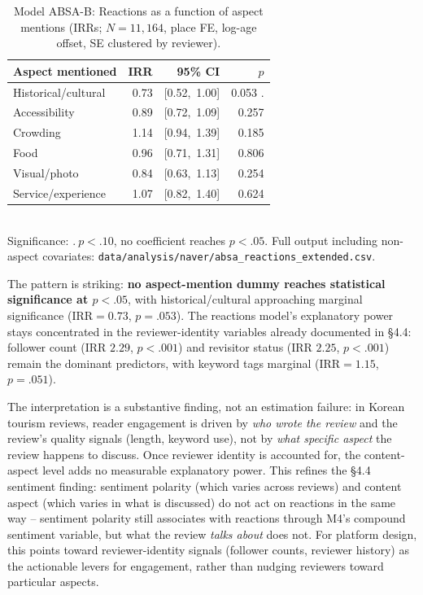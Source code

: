 \documentclass[10pt,a4paper]{article}
\begin{document}
\begin{table}[H]\centering
\caption{Model ABSA-B: Reactions as a function of aspect mentions (IRRs; $N=11{,}164$, place FE, log-age offset, SE clustered by reviewer).}
\label{tab:absaB}
\footnotesize
\begin{tabular}{@{}lrrr@{}}
\toprule
Aspect mentioned             & IRR   & 95\% CI               & $p$      \\
\midrule
Historical/cultural          & 0.73  & [0.52,\, 1.00]        & 0.053 .   \\
Accessibility                & 0.89  & [0.72,\, 1.09]        & 0.257    \\
Crowding                     & 1.14  & [0.94,\, 1.39]        & 0.185    \\
Food                         & 0.96  & [0.71,\, 1.31]        & 0.806    \\
Visual/photo                 & 0.84  & [0.63,\, 1.13]        & 0.254    \\
Service/experience           & 1.07  & [0.82,\, 1.40]        & 0.624    \\
\bottomrule
\end{tabular}
\\[3pt]
{\scriptsize Significance: $.\ p<.10$, no coefficient reaches $p<.05$. Full output including non-aspect covariates: \texttt{data/analysis/naver/absa\_reactions\_extended.csv}.}
\end{table}

The pattern is striking: \textbf{no aspect-mention dummy reaches
statistical significance at $p<.05$}, with historical/cultural
approaching marginal significance ($\text{IRR}=0.73$, $p=.053$). The
reactions model's explanatory power stays concentrated in the
reviewer-identity variables already documented in \S4.4: follower count
(IRR $2.29$, $p<.001$) and revisitor status (IRR $2.25$, $p<.001$)
remain the dominant predictors, with keyword tags marginal
($\text{IRR}=1.15$, $p=.051$).

The interpretation is a substantive finding, not an estimation failure:
in Korean tourism reviews, reader engagement is driven by \emph{who
wrote the review} and the review's quality signals (length, keyword use),
not by \emph{what specific aspect} the review happens to discuss. Once
reviewer identity is accounted for, the content-aspect level adds no
measurable explanatory power. This refines the \S4.4 sentiment finding:
sentiment polarity (which varies across reviews) and content aspect
(which varies in what is discussed) do not act on reactions in the same
way -- sentiment polarity still associates with reactions through M4's
compound sentiment variable, but what the review \emph{talks about} does
not. For platform design, this points toward reviewer-identity signals
(follower counts, reviewer history) as the actionable levers for
engagement, rather than nudging reviewers toward particular aspects.
\end{document}
